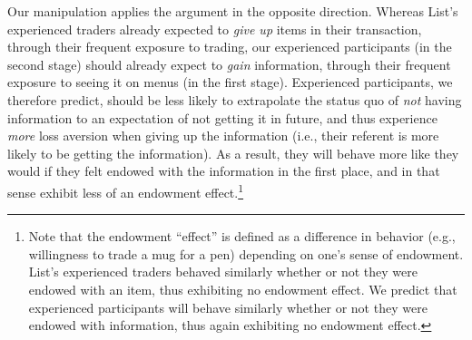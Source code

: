 
Our manipulation applies the argument in the opposite direction. Whereas List’s experienced traders already expected to \emph{give up} items in their transaction, through their frequent exposure to trading, our experienced participants (in the second stage) should already expect to \emph{gain} information, through their frequent exposure to seeing it on menus (in the first stage). Experienced participants, we therefore predict, should be less likely to extrapolate the status quo of \emph{not} having information to an expectation of not getting it in future, and thus experience \emph{more} loss aversion when giving up the information (i.e., their referent is more likely to be getting the information). As a result, they will behave more like they would if they felt endowed with the information in the first place, and in that sense exhibit less of an endowment effect.\footnote{Note that the endowment \enquote{effect} is defined as a difference in behavior (e.g., willingness to trade a mug for a pen) depending on one’s sense of endowment. List’s experienced traders behaved similarly whether or not they were endowed with an item, thus exhibiting no endowment effect. We predict that experienced participants will behave similarly whether or not they were endowed with information, thus again exhibiting no endowment effect.}


